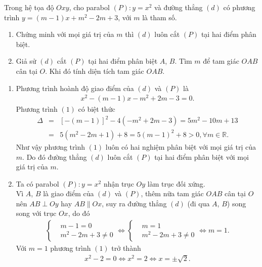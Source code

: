\begin{ex}%
	Trong hệ tọa độ $Oxy$, cho parabol $(P)\colon y=x^2$ và đường thẳng $(d)$ có phương trình $y=(m-1)x+m^2-2m+3$, với $m$ là tham số.
	\begin{enumerate}
		\item Chứng minh với mọi giá trị của $m$ thì $(d)$ luôn cắt $(P)$ tại hai điểm phân biệt.
		\item Giả sử $(d)$ cắt $(P)$ tại hai điểm phân biệt $A$, $B$. Tìm $m$ để tam giác $OAB$ cân tại $O$. Khi đó tính diện tích tam giác $OAB$.
	\end{enumerate}
	\loigiai
	{
		\begin{enumerate}
			\item Phương trình hoành độ giao điểm của $(d)$ và $(P)$ là
			\begin{align*}
			 x^2-(m-1)x-m^2+2m-3=0. \tag{1}
			\end{align*}
			Phương trình $(1)$ có biệt thức
			\begin{eqnarray*}
			 \Delta &=& [-(m-1)]^2-4(-m^2+2m-3) = 5m^2-10m+13 \\
			 &=& 5(m^2-2m+1)+8=5(m-1)^2+8>0,\forall m \in \mathbb{R}.
			\end{eqnarray*}
			Như vậy phương trình $(1)$ luôn có hai nghiệm phân biệt với mọi giá trị của $m$. Do đó đường thẳng $(d)$ luôn cắt $(P)$ tại hai điểm phân biệt với mọi giá trị của $m$.
			\item Ta có parabol $(P)\colon y=x^2$ nhận trục $Oy$ làm trục đối xứng.\\
			Vì $A$, $B$ là giao điểm của $(d)$ và $(P)$, thêm nữa tam giác $OAB$ cân tại $O$ nên $AB \perp Oy$ hay $AB \parallel Ox$, suy ra đường thẳng $(d)$ (đi qua $A$, $B$) song song với trục $Ox$, do đó
			\begin{eqnarray*}
			 \left\{\begin{aligned}&m-1=0 \\&m^2-2m+3 \neq 0\end{aligned}\right. \Leftrightarrow \left\{\begin{aligned}&m=1 \\&m^2-2m+3\neq 0\end{aligned}\right. \Leftrightarrow m=1.
			\end{eqnarray*}
			Với $m=1$ phương trình $(1)$ trở thành
			\begin{eqnarray*}
			 x^2-2=0 \Leftrightarrow x^2=2 \Leftrightarrow x = \pm \sqrt{2}.
			\end{eqnarray*}

\end{enumerate}}
\end{ex}
